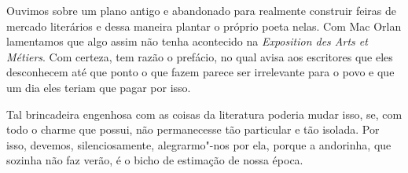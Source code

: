 Ouvimos sobre um plano antigo e abandonado para realmente construir
feiras de mercado literários e dessa maneira plantar o próprio poeta
nelas. Com Mac Orlan lamentamos que algo assim não tenha acontecido na
\emph{Exposition des Arts et Métiers}. Com certeza, tem razão o
prefácio, no qual avisa aos escritores que eles desconhecem até que
ponto o que fazem parece ser irrelevante para o povo e que um dia eles
teriam que pagar por isso.

Tal brincadeira engenhosa com as coisas da literatura poderia mudar
isso, se, com todo o charme que possui, não permanecesse tão particular
e tão isolada. Por isso, devemos, silenciosamente, alegrarmo"-nos por
ela, porque a andorinha, que sozinha não faz verão, é o bicho de
estimação de nossa época.
